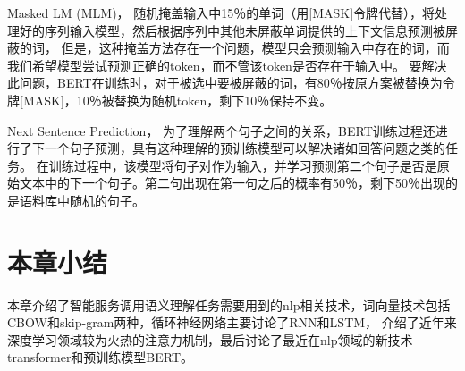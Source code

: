 Masked LM (MLM)，
随机掩盖输入中15％的单词（用[MASK]令牌代替），将处理好的序列输入模型，然后根据序列中其他未屏蔽单词提供的上下文信息预测被屏蔽的词，
但是，这种掩盖方法存在一个问题，模型只会预测输入中存在的词，而我们希望模型尝试预测正确的token，而不管该token是否存在于输入中。
要解决此问题，BERT在训练时，对于被选中要被屏蔽的词，有80％按原方案被替换为令牌[MASK]，10％被替换为随机token，剩下10％保持不变。

Next Sentence Prediction，
为了理解两个句子之间的关系，BERT训练过程还进行了下一个句子预测，具有这种理解的预训练模型可以解决诸如回答问题之类的任务。
在训练过程中，该模型将句子对作为输入，并学习预测第二个句子是否是原始文本中的下一个句子。第二句出现在第一句之后的概率有50％，剩下50％出现的是语料库中随机的句子。

\section{本章小结}
本章介绍了智能服务调用语义理解任务需要用到的nlp相关技术，词向量技术包括CBOW和skip-gram两种，循环神经网络主要讨论了RNN和LSTM，
介绍了近年来深度学习领域较为火热的注意力机制，最后讨论了最近在nlp领域的新技术transformer和预训练模型BERT。